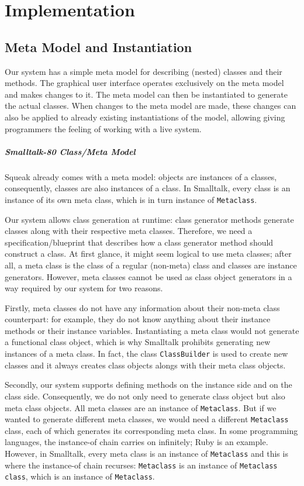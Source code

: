 \chapter{Implementation}

\section{Meta Model and Instantiation}
Our system has a simple meta model for describing (nested) classes and their methods. The graphical user interface operates exclusively on the meta model and makes changes to it. The meta model can then be instantiated to generate the actual classes. When changes to the meta model are made, these changes can also be applied to already existing instantiations of the model, allowing giving programmers the feeling of working with a live system.

\paragraph{Smalltalk-80 Class/Meta Model}
Squeak already comes with a meta model: objects are instances of a classes, consequently, classes are also instances of a class. In Smalltalk, every class is an instance of its own meta class, which is in turn instance of \texttt{Metaclass}.

Our system allows class generation at runtime: class generator methods generate classes along with their respective meta classes. Therefore, we need a specification/blueprint that describes how a class generator method should construct a class. At first glance, it might seem logical to use meta classes; after all, a meta class is the class of a regular (non-meta) class and classes are instance generators. However, meta classes cannot be used as class object generators in a way required by our system for two reasons.

Firstly, meta classes do not have any information about their non-meta class counterpart: for example, they do not know anything about their instance methods or their instance variables. Instantiating a meta class would not generate a functional class object, which is why Smalltalk prohibits generating new instances of a meta class. In fact, the class \texttt{ClassBuilder} is used to create new classes and it always creates class objects alongs with their meta class objects.

Secondly, our system supports defining methods on the instance side and on the class side. Consequently, we do not only need to generate class object but also meta class objects. All meta classes are an instance of \texttt{Metaclass}. But if we wanted to generate different meta classes, we would need a different \texttt{Metaclass} class, each of which generates its corresponding meta class. In some programming languages, the instance-of chain carries on infinitely; Ruby is an example. However, in Smalltalk, every meta class is an instance of \texttt{Metaclass} and this is where the instance-of chain recurses: \texttt{Metaclass} is an instance of \texttt{Metaclass class}, which is an instance of \texttt{Metaclass}.

